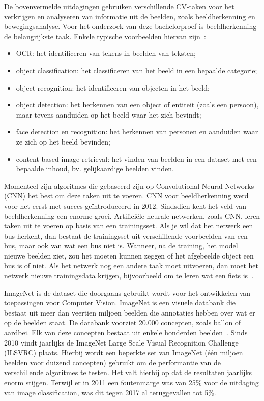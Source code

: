 De bovenvermelde uitdagingen gebruiken verschillende CV-taken voor het verkrijgen en analyseren van informatie uit de beelden, zoals beeldherkenning en bewegingsanalyse. Voor het onderzoek van deze bachelorproef is beeldherkenning de belangrijkste taak. Enkele typische voorbeelden hiervan zijn~\autocite{wikiCV}:
\begin{itemize}
	\item OCR: het identificeren van tekens in beelden van teksten;
	\item object classification: het classificeren van het beeld in een bepaalde categorie;
	\item object recognition: het identificeren van objecten in het beeld;
	\item object detection: het herkennen van een object of entiteit (zoals een persoon), maar tevens aanduiden op het beeld waar het zich bevindt;
	\item face detection en recognition: het herkennen van personen en aanduiden waar ze zich op het beeld bevinden;
	\item content-based image retrieval: het vinden van beelden in een dataset met een bepaalde inhoud, bv. gelijkaardige beelden vinden.
\end{itemize}


Momenteel zijn algoritmes die gebaseerd zijn op Convolutional Neural Networks (CNN) het best om deze taken uit te voeren. CNN voor beeldherkenning werd voor het eerst met succes geïntroduceerd in 2012. Sindsdien kent het veld van beeldherkenning een enorme groei. Artifici\"{e}le neurale netwerken, zoals CNN, leren taken uit te voeren op basis van een trainingsset. Als je wil dat het netwerk een bus herkent, dan bestaat de trainingsset uit verschillende voorbeelden van een bus, maar ook van wat een bus niet is. Wanneer, na de training, het model nieuwe beelden ziet, zou het moeten kunnen zeggen of het afgebeelde object een bus is of niet. Als het netwerk nog een andere taak moet uitvoeren, dan moet het netwerk nieuwe trainingsdata krijgen, bijvoorbeeld om te leren wat een fiets is~\autocite{Pokharna2016}. 

ImageNet is de dataset die doorgaans gebruikt wordt voor het ontwikkelen van toepassingen voor Computer Vision. ImageNet is een visuele databank die bestaat uit meer dan veertien miljoen beelden die annotaties hebben over wat er op de beelden staat. De databank voorziet 20.000 concepten, zoals ballon of aardbei. Elk van deze concepten bestaat uit enkele honderden beelden~\autocites[2]{WikiImageNet}{Brownlee2019a}. Sinds 2010 vindt jaarlijks de ImageNet Large Scale Visual Recognition Challenge (ILSVRC) plaats. Hierbij wordt een beperkte set van ImageNet (één miljoen beelden voor duizend concepten) gebruikt om de performantie van de verschillende algoritmes te testen. Het valt hierbij op dat de resultaten jaarlijks enorm stijgen. Terwijl er in 2011 een foutenmarge was van 25\% voor de uitdaging van image classification, was dit tegen 2017 al teruggevallen tot 5\%. 


